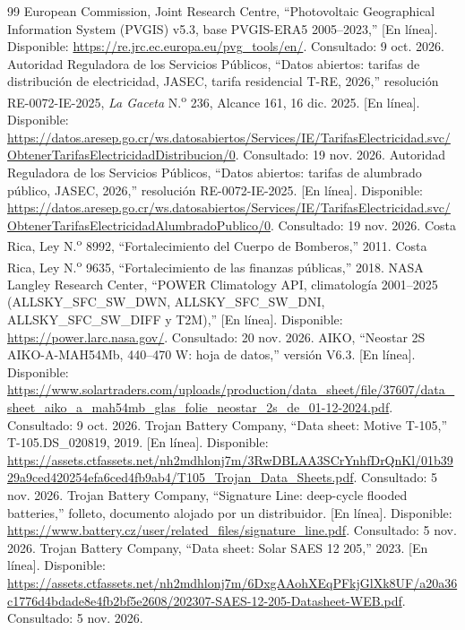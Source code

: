 \begin{thebibliography}{99}
 European Commission, Joint Research Centre, ``Photovoltaic Geographical Information System (PVGIS) v5.3, base PVGIS-ERA5 2005--2023,'' [En línea]. Disponible: \url{https://re.jrc.ec.europa.eu/pvg_tools/en/}. Consultado: 9 oct. 2026.
 Autoridad Reguladora de los Servicios Públicos, ``Datos abiertos: tarifas de distribución de electricidad, JASEC, tarifa residencial T-RE, 2026,'' resolución RE-0072-IE-2025, \textit{La Gaceta} N.\textsuperscript{o} 236, Alcance 161, 16 dic. 2025. [En línea]. Disponible: \url{https://datos.aresep.go.cr/ws.datosabiertos/Services/IE/TarifasElectricidad.svc/ObtenerTarifasElectricidadDistribucion/0}. Consultado: 19 nov. 2026.
 Autoridad Reguladora de los Servicios Públicos, ``Datos abiertos: tarifas de alumbrado público, JASEC, 2026,'' resolución RE-0072-IE-2025. [En línea]. Disponible: \url{https://datos.aresep.go.cr/ws.datosabiertos/Services/IE/TarifasElectricidad.svc/ObtenerTarifasElectricidadAlumbradoPublico/0}. Consultado: 19 nov. 2026.
 Costa Rica, Ley N.\textsuperscript{o} 8992, ``Fortalecimiento del Cuerpo de Bomberos,'' 2011.
 Costa Rica, Ley N.\textsuperscript{o} 9635, ``Fortalecimiento de las finanzas públicas,'' 2018.
 NASA Langley Research Center, ``POWER Climatology API, climatología 2001--2025 (ALLSKY\_SFC\_SW\_DWN, ALLSKY\_SFC\_SW\_DNI, ALLSKY\_SFC\_SW\_DIFF y T2M),'' [En línea]. Disponible: \url{https://power.larc.nasa.gov/}. Consultado: 20 nov. 2026.
 AIKO, ``Neostar 2S AIKO-A-MAH54Mb, 440--470 W: hoja de datos,'' versión V6.3. [En línea]. Disponible: \url{https://www.solartraders.com/uploads/production/data_sheet/file/37607/data_sheet_aiko_a_mah54mb_glas_folie_neostar_2s_de_01-12-2024.pdf}. Consultado: 9 oct. 2026.
 Trojan Battery Company, ``Data sheet: Motive T-105,'' T-105.DS\_020819, 2019. [En línea]. Disponible: \url{https://assets.ctfassets.net/nh2mdhlonj7m/3RwDBLAA3SCrYnhfDrQnKl/01b3929a9ced420254efa6ced4fb9ab4/T105_Trojan_Data_Sheets.pdf}. Consultado: 5 nov. 2026.
 Trojan Battery Company, ``Signature Line: deep-cycle flooded batteries,'' folleto, documento alojado por un distribuidor. [En línea]. Disponible: \url{https://www.battery.cz/user/related_files/signature_line.pdf}. Consultado: 5 nov. 2026.
 Trojan Battery Company, ``Data sheet: Solar SAES 12 205,'' 2023. [En línea]. Disponible: \url{https://assets.ctfassets.net/nh2mdhlonj7m/6DxgAAohXEqPFkjGlXk8UF/a20a36c1776d4bdade8e4fb2bf5e2608/202307-SAES-12-205-Datasheet-WEB.pdf}. Consultado: 5 nov. 2026.

\end{thebibliography}
